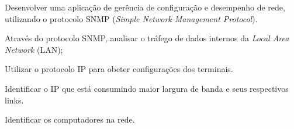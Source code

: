 


\par Desenvolver uma aplicação de gerência de configuração e desempenho de rede,
utilizando o protocolo SNMP (\textit{Simple Network Management Protocol}).


\par Através do protocolo SNMP, analisar o tráfego de dados internos da
\textit{Local Area Network} (LAN); 

\par Utilizar o protocolo IP para obeter configurações dos terminais.

\par Identificar o IP que está consumindo maior largura de banda e seus
respectivos links.

\par Identificar os computadores na rede.


